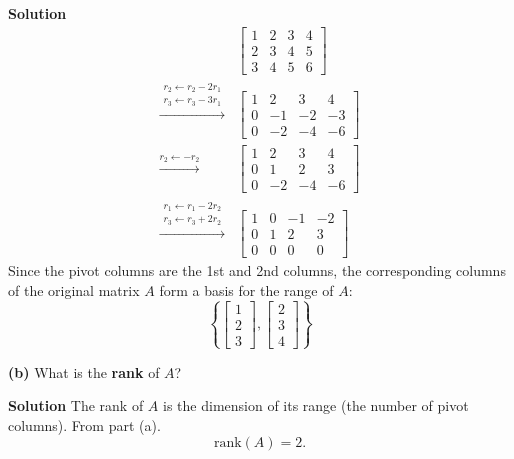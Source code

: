 \documentclass[12pt,a4paper]{article}
\begin{document}
\textbf{Solution}
\begin{align*}
	&\begin{bmatrix}
		1 & 2 & 3 & 4 \\
		2 & 3 & 4 & 5 \\
		3 & 4 & 5 & 6
	\end{bmatrix} \\
	\overset{\substack{r_2 \leftarrow r_2 - 2r_1 \\ r_3 \leftarrow r_3 - 3r_1}}{\longrightarrow} &\begin{bmatrix}
		1 & 2 & 3 & 4 \\
		0 & -1 & -2 & -3 \\
		0 & -2 & -4 & -6
	\end{bmatrix} \\
	\overset{r_2 \leftarrow -r_2}{\longrightarrow} &\begin{bmatrix}
		1 & 2 & 3 & 4 \\
		0 & 1 & 2 & 3 \\
		0 & -2 & -4 & -6
	\end{bmatrix} \\
	\overset{\substack{r_1 \leftarrow r_1 - 2r_2 \\ r_3 \leftarrow r_3 + 2r_2}}{\longrightarrow} &\begin{bmatrix}
		1 & 0 & -1 & -2 \\
		0 & 1 & 2 & 3 \\
		0 & 0 & 0 & 0
	\end{bmatrix}
\end{align*}
Since the pivot columns are the 1st and 2nd columns, the corresponding columns of the original matrix $A$ form a basis for the range of $A$:
\[
\left\{
\begin{bmatrix}
	1 \\ 2 \\ 3
\end{bmatrix},
\begin{bmatrix}
	2 \\ 3 \\ 4
\end{bmatrix}
\right\}
\]

\Needspace{4cm}
\textbf{(b)} What is the \textbf{rank} of $A$?

\textbf{Solution}
The rank of $A$ is the dimension of its range (the number of pivot columns). From part (a).
\[
\text{rank}(A) = 2.
\]

\par\nopagebreak\vspace{2cm}
\end{document}

